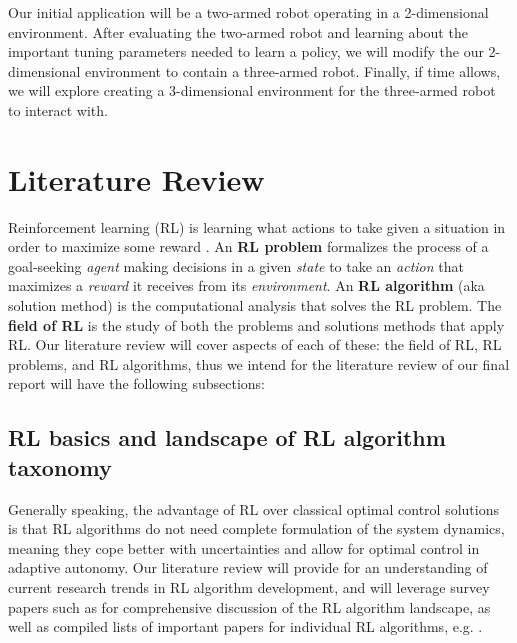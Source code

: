 \documentclass{article}
\begin{document}
Our initial application will be a two-armed robot operating in a 2-dimensional environment. After evaluating the two-armed robot and learning about the important tuning parameters needed to learn a policy, we will modify the our 2-dimensional environment to contain a three-armed robot. Finally, if time allows, we will explore creating a 3-dimensional environment for the three-armed robot to interact with.




\section{Literature Review}
Reinforcement learning (RL) is learning what actions to take given a situation in order to maximize some reward \cite{sutton2018reinforcement}. An \textbf{RL problem} formalizes the process of a goal-seeking \emph{agent} making decisions in a given \emph{state} to take an \emph{action} that maximizes a \emph{reward} it receives from its \emph{environment}.  An \textbf{RL algorithm} (aka solution method) is the computational analysis that solves the RL problem. The \textbf{field of RL} is the study of both the problems and solutions methods that apply RL. Our literature review will cover aspects of each of these: the field of RL, RL problems, and RL algorithms, thus we intend for the literature review of our final report will have the following subsections:

\subsection{RL basics and landscape of RL algorithm taxonomy}
Generally speaking, the advantage of RL over classical optimal control solutions is that RL algorithms do not need complete formulation of the system dynamics, meaning they cope better with uncertainties and allow for optimal control in adaptive autonomy. Our literature review will provide for an understanding of current research trends in RL algorithm development, and will leverage survey papers such as \cite{kiumarsi2017optimal} for comprehensive discussion of the RL algorithm landscape, as well as compiled lists of important papers for individual RL algorithms, e.g. \cite{key}.
\end{document}
